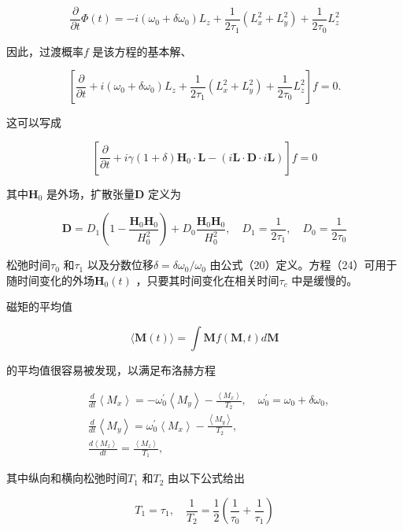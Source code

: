 \documentclass[10pt]{article}
\begin{document}
\[
\frac{\partial}{\partial t} \Phi(t)=-i\left(\omega_{0}+\delta \omega_{0}\right) L_{z}+\frac{1}{2 \tau_{1}}\left(L_{x}^{2}+L_{y}^{2}\right)+\frac{1}{2 \tau_{0}} L_{z}^{2}
\] 

因此，过渡概率\(f\) 是该方程的基本解、

\[
\left[\frac{\partial}{\partial t}+i\left(\omega_{0}+\delta \omega_{0}\right) L_{z}+\frac{1}{2 \tau_{1}}\left(L_{x}^{2}+L_{y}^{2}\right)+\frac{1}{2 \tau_{0}} L_{z}^{2}\right] f=0 .
\] 

这可以写成

\[
\left[\frac{\partial}{\partial t}+i \gamma(1+\delta) \boldsymbol{H}_{0} \cdot \mathbf{L}-(i \boldsymbol{L} \cdot \boldsymbol{D} \cdot i \boldsymbol{L})\right] f=0
\] 

其中\(\boldsymbol{H}_{0}\) 是外场，扩散张量\(\boldsymbol{D}\) 定义为

\[
\boldsymbol{D}=D_{1}\left(1-\frac{\boldsymbol{H}_{0} \boldsymbol{H}_{0}}{H_{0}^{2}}\right)+D_{0} \frac{\boldsymbol{H}_{0} \boldsymbol{H}_{0}}{H_{0}^{2}}, \quad D_{1}=\frac{1}{2 \tau_{1}}, \quad D_{0}=\frac{1}{2 \tau_{0}}
\] 

松弛时间\(\tau_{0}\) 和\(\tau_{1}\) 以及分数位移\(\delta=\delta \omega_{0} / \omega_{0}\) 由公式（20）定义。方程（24）可用于随时间变化的外场\(\boldsymbol{H}_{0}(t)\) ，只要其时间变化在相关时间\(\tau_{c}\) 中是缓慢的。

磁矩的平均值

\[
\langle\boldsymbol{M}(t)\rangle=\int \boldsymbol{M} f(\boldsymbol{M}, t) d \boldsymbol{M}
\] 

的平均值很容易被发现，以满足布洛赫方程

\[
\begin{aligned}
& \frac{d}{d t}\left\langle M_{x}\right\rangle=-\omega_{0}^{\prime}\left\langle M_{y}\right\rangle-\frac{\left\langle M_{x}\right\rangle}{T_{2}}, \quad \omega_{0}^{\prime}=\omega_{0}+\delta \omega_{0}, \\
& \frac{d}{d t}\left\langle M_{y}\right\rangle=\omega_{0}^{\prime}\left\langle M_{x}\right\rangle-\frac{\left\langle M_{y}\right\rangle}{T_{2}}, \\
& \frac{d\left\langle M_{z}\right\rangle}{d t}=\frac{\left\langle M_{z}\right\rangle}{T_{1}},
\end{aligned}
\] 

其中纵向和横向松弛时间\(T_{1}\) 和\(T_{2}\) 由以下公式给出

\[
T_{1}=\tau_{1}, \quad \frac{1}{T_{2}}=\frac{1}{2}\left(\frac{1}{\tau_{0}}+\frac{1}{\tau_{1}}\right)
\] 
\end{document}
